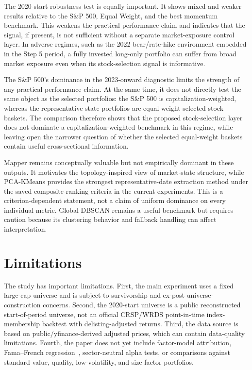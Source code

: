 \documentclass[runningheads]{llncs}
\begin{document}
The 2020-start robustness test is equally important. It shows mixed and weaker results relative to the S\&P 500, Equal Weight, and the best momentum benchmark. This weakens the practical performance claim and indicates that the signal, if present, is not sufficient without a separate market-exposure control layer. In adverse regimes, such as the 2022 bear/rate-hike environment embedded in the Step 5 period, a fully invested long-only portfolio can suffer from broad market exposure even when its stock-selection signal is informative.

The S\&P 500's dominance in the 2023-onward diagnostic limits the strength of any practical performance claim. At the same time, it does not directly test the same object as the selected portfolios: the S\&P 500 is capitalization-weighted, whereas the representative-state portfolios are equal-weight selected-stock baskets. The comparison therefore shows that the proposed stock-selection layer does not dominate a capitalization-weighted benchmark in this regime, while leaving open the narrower question of whether the selected equal-weight baskets contain useful cross-sectional information.

Mapper remains conceptually valuable but not empirically dominant in these outputs. It motivates the topology-inspired view of market-state structure, while PCA-KMeans provides the strongest representative-date extraction method under the saved composite-ranking criteria in the current experiments. This is a criterion-dependent statement, not a claim of uniform dominance on every individual metric. Global DBSCAN remains a useful benchmark but requires caution because its clustering behavior and fallback handling can affect interpretation.

\section{Limitations}

The study has important limitations. First, the main experiment uses a fixed large-cap universe and is subject to survivorship and ex-post universe-construction concerns. Second, the 2020-start universe is a public reconstructed start-of-period universe, not an official CRSP/WRDS point-in-time index-membership backtest with delisting-adjusted returns. Third, the data source is based on public/yfinance-derived adjusted prices, which can contain data-quality limitations. Fourth, the paper does not yet include factor-model attribution, Fama--French regression~\cite{fama1993}, sector-neutral alpha tests, or comparisons against standard value, quality, low-volatility, and size factor portfolios.
\end{document}

